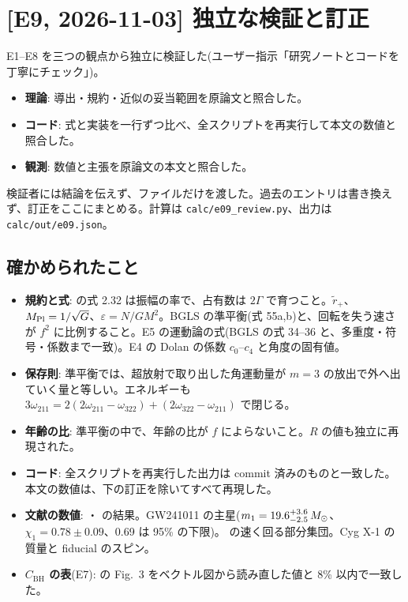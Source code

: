 \section{[E9, 2026-11-03] 独立な検証と訂正}\label{sec:e09}

E1--E8 を三つの観点から独立に検証した(ユーザー指示「研究ノートとコードを丁寧にチェック」)。
\begin{itemize}
\item \textbf{理論}: 導出・規約・近似の妥当範囲を原論文と照合した。
\item \textbf{コード}: 式と実装を一行ずつ比べ、全スクリプトを再実行して本文の数値と照合した。
\item \textbf{観測}: 数値と主張を原論文の本文と照合した。
\end{itemize}
検証者には結論を伝えず、ファイルだけを渡した。過去のエントリは書き換えず、訂正をここにまとめる。計算は \texttt{calc/e09\_review.py}、出力は \texttt{calc/out/e09.json}。

\subsection{確かめられたこと}

\begin{itemize}
\item \textbf{規約と式}:  の式 2.32 は振幅の率で、占有数は $2\Gamma$ で育つこと。$\tilde r_+$、$M_\mathrm{Pl}=1/\sqrt G$、$\varepsilon=N/GM^2$。BGLS の準平衡(式 55a,b)と、回転を失う速さが $f^2$ に比例すること。E5 の運動論の式(BGLS の式 34--36 と、多重度・符号・係数まで一致)。E4 の Dolan の係数 $c_0$--$c_4$ と角度の固有値。
\item \textbf{保存則}: 準平衡では、超放射で取り出した角運動量が $m=3$ の放出で外へ出ていく量と等しい。エネルギーも $3\omega_{211}=2(2\omega_{211}-\omega_{322})+(2\omega_{322}-\omega_{211})$ で閉じる。
\item \textbf{年齢の比}: 準平衡の中で、年齢の比が $f$ によらないこと。$R$ の値も独立に再現された。
\item \textbf{コード}: 全スクリプトを再実行した出力は commit 済みのものと一致した。本文の数値は、下の訂正を除いてすべて再現した。
\item \textbf{文献の数値}: ・ の結果。GW241011 の主星($m_1=19.6^{+3.6}_{-2.5}\,M_\odot$、$\chi_1=0.78\pm0.09$、0.69 は 95\% の下限)。 の速く回る部分集団。Cyg X-1 の質量と fiducial のスピン。
\item \textbf{$C_\mathrm{BH}$ の表}(E7):  の Fig.~3 をベクトル図から読み直した値と 8\% 以内で一致した。
\end{itemize}

